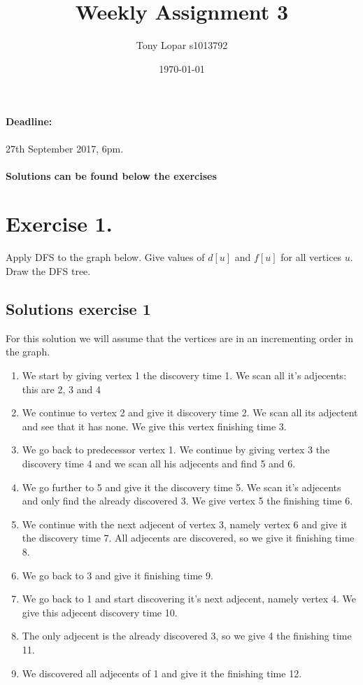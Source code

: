 \documentclass{article}
\begin{document}
\title{Weekly Assignment 3}
\date{\today}
\author{Tony Lopar s1013792}
\maketitle

\paragraph{Deadline:} 27th September 2017, 6pm.
\paragraph{Solutions can be found below the exercises}


\section*{Exercise 1.}
Apply DFS to the graph below. Give values of $d[u]$ and $f[u]$ for all vertices $u$. Draw the DFS tree.


\subsection*{Solutions exercise 1}
For this solution we will assume that the vertices are in an incrementing order in the graph.

\begin{enumerate}
    \item We start by giving vertex 1 the discovery time 1. We scan all it's adjecents: this are 2, 3 and 4
    \item We continue to vertex 2 and give it discovery time 2. We scan all its adjectent and see that it has none. We give this vertex finishing time 3.
    \item We go back to predecessor vertex 1. We continue by giving vertex 3 the discovery time 4 and we scan all his adjecents and find 5 and 6.
    \item We go further to 5 and give it the discovery time 5. We scan it's adjecents and only find the already discovered 3. We give vertex 5 the finishing time 6.
    \item We continue with the next adjecent of vertex 3, namely vertex 6 and give it the discovery time 7. All adjecents are discovered, so we give it finishing time 8.
    \item We go back to 3 and give it finishing time 9.
    \item We go back to 1 and start discovering it's next adjecent, namely vertex 4. We give this adjecent discovery time 10.
    \item The only adjecent is the already discovered 3, so we give 4 the finishing time 11.
    \item We discovered all adjecents of 1 and give it the finishing time 12.
\end{enumerate}
\end{document}
